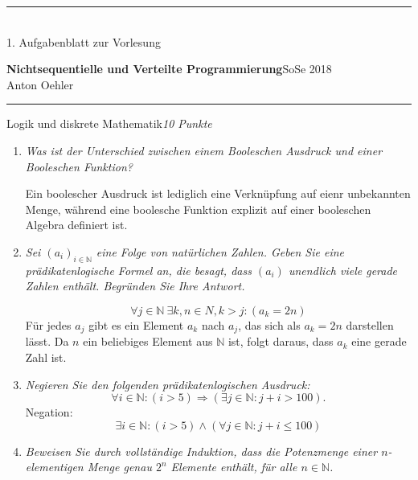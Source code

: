 \documentclass[a4paper,twoside,12pt]{article}
\newcommand{\ZETTELNUMMER}{1}
\newcounter{AUFGNR}
\newcommand{\AUFGABE}[2]{\vspace{0.3cm}\item[Aufgabe~\arabic{AUFGNR}]\stepcounter{AUFGNR} #1\hfill\emph{#2}}
\newcommand{\N}{\mathbb{N}}
\begin{document}
\pagestyle{empty}
\hrule\medskip
\rule{0ex}{0ex}\\[-1ex]
\ZETTELNUMMER. Aufgabenblatt zur Vorlesung

\smallskip
\noindent
\large
\textbf{Nichtsequentielle und Verteilte Programmierung}\hfill SoSe
2018 \\[0.5ex]
\normalsize
Anton Oehler

\medskip\hrule

\begin{description}
\AUFGABE{Logik und diskrete Mathematik}{10 Punkte}

\begin{enumerate}
\item \emph{Was ist der Unterschied zwischen einem Booleschen
  Ausdruck und einer Booleschen Funktion?}

  Ein boolescher Ausdruck ist lediglich eine Verkn\"upfung auf eienr unbekannten
  Menge, w\"ahrend eine boolesche Funktion explizit  auf einer booleschen Algebra
  definiert ist.
\item \emph{Sei $(a_i)_{i \in \N}$ eine Folge von nat\"urlichen Zahlen.
  Geben Sie eine pr\"adikatenlogische Formel an, die besagt,
  dass $(a_i)$ unendlich viele gerade Zahlen enth\"alt.
  Begr\"unden Sie Ihre Antwort.}

  \[
    \forall j \in \N \: \exists k,n \in N, k > j: (a_k = 2n)
  \]
  F\"ur jedes $a_j$ gibt es ein Element $a_k$ nach $a_j$, das sich als
  $a_k = 2n$ darstellen l\"asst. Da $n$ ein beliebiges Element aus $\N$ ist,
  folgt daraus, dass $a_k$ eine gerade Zahl ist.
\item \emph{Negieren Sie den folgenden pr\"adikatenlogischen
  Ausdruck:}
    \[
      \forall i \in \N: (i > 5) \Rightarrow (\exists j \in \N: j + i > 100).
    \]
  Negation:
    \[
      \exists i \in \N: (i > 5) \wedge (\forall j \in \N : j + i \leq 100)
    \]
\item \emph{Beweisen Sie durch vollst\"andige Induktion, dass die Potenzmenge
  einer $n$-elementigen Menge genau $2^n$ Elemente enth\"alt, f\"ur alle
  $n \in \N$.}


\end{enumerate}
\end{description}
\end{document}
